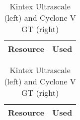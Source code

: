 \begin{table}[H]
\ifnum{}
\begin{minipage}{.45\linewidth}
\centering
\begin{tabular}{|l|r|}
\hline
\rowcolor{iob-green}
\textbf{Resource}  & \textbf{Used} \\
\hline
\hline
 
\end{tabular}
\end{minipage}
\fi
\ifnum{}
\begin{minipage}{.45\linewidth}
\centering
\begin{tabular}{|l|r|}
\hline
\rowcolor{iob-green}
\textbf{Resource}  & \textbf{Used} \\
\hline
\hline
 
\end{tabular}
\fi
\end{minipage}
\caption{Kintex Ultrascale (left) and Cyclone V GT (right)}
\end{table}
